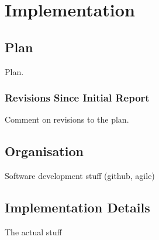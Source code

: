 
\chapter[Implementation]{Implementation} %

\label{Chapter6} %





\section{Plan}
Plan.

\subsection{Revisions Since Initial Report}
Comment on revisions to the plan.


\section{Organisation}
Software development stuff (github, agile)


\section{Implementation Details}
The actual stuff

